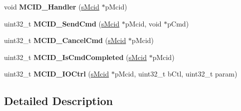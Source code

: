 \begin{DoxyCompactItemize}
void {\bfseries M\+C\+I\+D\+\_\+\+Handler} (\mbox{\hyperlink{group__mcid__structs_ga4c4fb535b1abc784ad83425b7a10f576}{s\+Mcid}} $\ast$p\+Mcid)
\item 
\mbox{\label{group__mcid__functions_ga71c682b80833894cc847b231139874d5}} 
uint32\+\_\+t {\bfseries M\+C\+I\+D\+\_\+\+Send\+Cmd} (\mbox{\hyperlink{group__mcid__structs_ga4c4fb535b1abc784ad83425b7a10f576}{s\+Mcid}} $\ast$p\+Mcid, void $\ast$p\+Cmd)
\item 
\mbox{\label{group__mcid__functions_gaa42ae91258675d685937a68c69b2afdf}} 
uint32\+\_\+t {\bfseries M\+C\+I\+D\+\_\+\+Cancel\+Cmd} (\mbox{\hyperlink{group__mcid__structs_ga4c4fb535b1abc784ad83425b7a10f576}{s\+Mcid}} $\ast$p\+Mcid)
\item 
\mbox{\label{group__mcid__functions_gae956aa6961d961be8d3791413d81497f}} 
uint32\+\_\+t {\bfseries M\+C\+I\+D\+\_\+\+Is\+Cmd\+Completed} (\mbox{\hyperlink{group__mcid__structs_ga4c4fb535b1abc784ad83425b7a10f576}{s\+Mcid}} $\ast$p\+Mcid)
\item 
\mbox{\label{group__mcid__functions_ga26e85daa2248e83129b01f755b1cfc0b}} 
uint32\+\_\+t {\bfseries M\+C\+I\+D\+\_\+\+I\+O\+Ctrl} (\mbox{\hyperlink{group__mcid__structs_ga4c4fb535b1abc784ad83425b7a10f576}{s\+Mcid}} $\ast$p\+Mcid, uint32\+\_\+t b\+Ctl, uint32\+\_\+t param)
\end{DoxyCompactItemize}


\subsection{Detailed Description}
